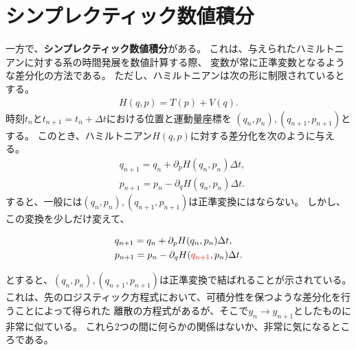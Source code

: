 \documentclass{jsarticle}
\begin{document}
\section{シンプレクティック数値積分}
一方で、\textbf{シンプレクティック数値積分}\cite{吉田春夫1990symplectic}がある。
これは、与えられたハミルトニアンに対する系の時間発展を数値計算する際、
変数が常に正準変数となるような差分化の方法である。
ただし、ハミルトニアンは次の形に制限されているとする。
\begin{align}
H(q,p)=T(p)+V(q).
\end{align}
時刻$t_{n}$と$t_{n+1}=t_{n}+\Delta t$における位置と運動量座標を
$(q_{n},p_{n}),(q_{n+1},p_{n+1})$とする。
このとき、ハミルトニアン$H(q,p)$に対する差分化を次のように与える。
\begin{align}
&q_{n+1}=q_{n}+\partial_{p}H(q_{n},p_{n})\Delta t,\\
&p_{n+1}=p_{n}-\partial_{q}H(q_{n},p_{n})\Delta t.
\end{align}
すると、一般には$(q_{n},p_{n}),(q_{n+1},p_{n+1})$は正準変換にはならない。
しかし、この変換を少しだけ変えて、
\begin{framed}
\begin{align}
&q_{n+1}=q_{n}+\partial_{p}H(q_{n},p_{n})\Delta t,\\
&p_{n+1}=p_{n}-\partial_{q}H(\textcolor{red}{q_{n+1}},p_{n})\Delta t.
\end{align}
\end{framed}
とすると、$(q_{n},p_{n}),(q_{n+1},p_{n+1})$は正準変換で結ばれることが示されている。
これは、先のロジスティック方程式において、可積分性を保つような差分化を行うことによって得られた
離散の方程式があるが、そこで$y_{n}\to y_{n+1}$としたものに非常に似ている。
これら2つの間に何らかの関係はないか、非常に気になるところである。


\end{document}
